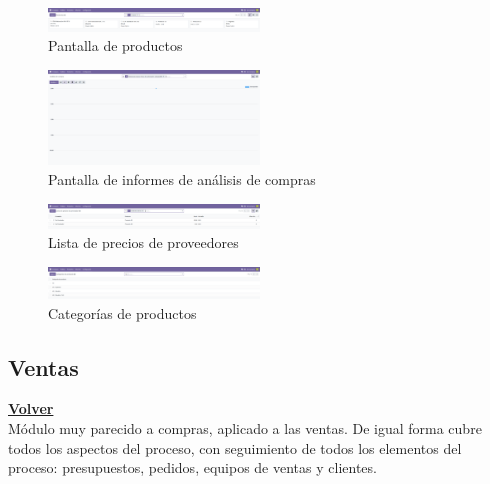 \documentclass[a4paper,12pt]{article}
\begin{document}
\begin{figure}[h!]
    \centering
    \includegraphics[width=0.5\textwidth]{pr2odoo36-pantallaProductos.png}
    \caption{Pantalla de productos}
\end{figure}
\FloatBarrier

\begin{figure}[h!]
    \centering
    \includegraphics[width=0.5\textwidth]{pr2odoo37-analisisCompras.png}
    \caption{Pantalla de informes de análisis de compras}
\end{figure}
\FloatBarrier

\begin{figure}[h!]
    \centering
    \includegraphics[width=0.5\textwidth]{pr2odoo38-preciosProveedor.png}
    \caption{Lista de precios de proveedores}
\end{figure}
\FloatBarrier

\begin{figure}[h!]
    \centering
    \includegraphics[width=0.5\textwidth]{pr2odoo39-categoriasPrioductos.png}
    \caption{Categorías de productos}
\end{figure}
\FloatBarrier


\subsection{Ventas}
\hyperlink{anchor-indice}{\textbf{Volver}}\\

Módulo muy parecido a compras, aplicado a las ventas. De igual forma cubre todos los aspectos del proceso, con seguimiento de todos los elementos del proceso: presupuestos, pedidos, equipos de ventas y clientes.
\end{document}
